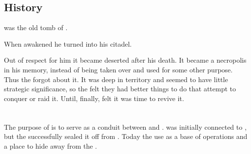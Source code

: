 \subsection{History}
\Nithdornazsh was the old tomb of \Nexagglachel. 

When \Nexagglachel awakened he turned \Nexagglachel into his citadel. 

Out of respect for him it became deserted after his death. 
It became a necropolis in his memory, instead of being taken over and used for some other purpose. 
Thus the \resphain forgot about it. 
It was deep in \draconic territory and seemed to have little strategic significance, so the \resphain felt they had better things to do that attempt to conquer or raid it.
Until, finally, \Secherdamon felt it was time to revive it. 















\section{\Nyx}
\index{\Nyx}

The purpose of \Nyx{} is to serve as a conduit between \Erebos{} and \Miith{}. 
\Nyx{} was initially connected to \Erebos{}, but the \dragons{} successfully sealed it off from \Erebos{}. 
Today the \banes{} use \Nyx{} as a base of operations and a place to hide away from the \dragons{}. 




